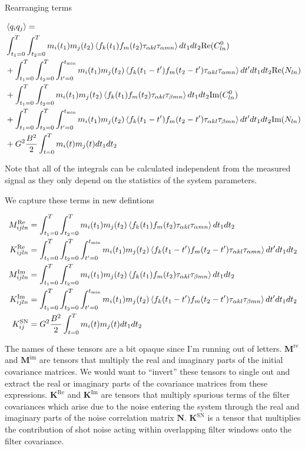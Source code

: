 \documentclass[12pt]{article}
\newcommand{\bv}[1]{\boldsymbol{#1}}
\begin{document}
Rearranging terms

\begin{align}
&\Braket{q_iq_j} =\\
& \int_{t_1=0}^{T}\int_{t_2=0}^T m_i(t_1)m_j(t_2) \Braket{f_k(t_1)f_m(t_2)\tau_{\alpha kl}\tau_{\alpha mn}} dt_1 dt_2 \text{Re}(C^0_{ln})\\
& +\int_{t_1=0}^{T}\int_{t_2=0}^T\int_{t'=0}^{t_{\text{min}}} m_i(t_1)m_j(t_2) \Braket{f_k(t_1-t')f_m(t_2-t')\tau_{\alpha kl}\tau_{\alpha mn}} dt' dt_1 dt_2 \text{Re}(N_{ln})\\
&+\int_{t_1=0}^{T}\int_{t_2=0}^T m_i(t_1)m_j(t_2) \Braket{f_k(t_1)f_m(t_2)\tau_{\alpha kl}\tau_{\beta mn}} dt_1 dt_2 \text{Im}(C^0_{ln})\\
& +\int_{t_1=0}^{T}\int_{t_2=0}^T\int_{t'=0}^{t_{\text{min}}} m_i(t_1)m_j(t_2) \Braket{f_k(t_1-t')f_m(t_2-t')\tau_{\alpha kl}\tau_{\beta mn}} dt' dt_1 dt_2 \text{Im}(N_{ln})\\
&+G^2 \frac{B^2}{2}\int_{t=0}^T m_i(t)m_j(t) dt_1 dt_2
\end{align}

Note that all of the integrals can be calculated independent from the measured signal as they only depend on the statistics of the system parameters.

We capture these terms in new defintions

\begin{align}
M^{\text{Re}}_{ijln} &= \int_{t_1=0}^{T}\int_{t_2=0}^T m_i(t_1)m_j(t_2) \Braket{f_k(t_1)f_m(t_2)\tau_{\alpha kl}\tau_{\alpha mn}} dt_1 dt_2\\
K^{\text{Re}}_{ijln} &= \int_{t_1=0}^{T}\int_{t_2=0}^T\int_{t'=0}^{t_{\text{min}}} m_i(t_1)m_j(t_2) \Braket{f_k(t_1-t')f_m(t_2-t')\tau_{\alpha kl}\tau_{\alpha mn}} dt' dt_1 dt_2\\
M^{\text{Im}}_{ijln} &= \int_{t_1=0}^{T}\int_{t_2=0}^T m_i(t_1)m_j(t_2) \Braket{f_k(t_1)f_m(t_2)\tau_{\alpha kl}\tau_{\beta mn}} dt_1 dt_2\\
K^{\text{Im}}_{ijln} &= \int_{t_1=0}^{T}\int_{t_2=0}^T\int_{t'=0}^{t_{\text{min}}} m_i(t_1)m_j(t_2) \Braket{f_k(t_1-t')f_m(t_2-t')\tau_{\alpha kl}\tau_{\beta mn}} dt' dt_1 dt_2\\
K^{\text{SN}}_{ij} &= G^2 \frac{B^2}{2}\int_{t=0}^T m_i(t)m_j(t) dt_1 dt_2 
\end{align}

The names of these tensors are a bit opaque since I'm running out of letters. $\bv{M}^{\text{re}}$ and $\bv{M}^{\text{im}}$ are tensors that multiply the real and imaginary parts of the initial covariance matrices. We would want to ``invert'' these tensors to single out and extract the real or imaginary parts of the covariance matrices from these expressions. $\bv{K}^{\text{Re}}$ and $\bv{K}^{\text{Im}}$ are tensors that multiply spurious terms of the filter covariances which arise due to the noise entering the system through the real and imaginary parts of the noise correlation matrix $\bv{N}$. $\bv{K}^{\text{SN}}$ is a tensor that multiplies the contribution of shot noise acting within overlapping filter windows onto the filter covariance.
\end{document}
